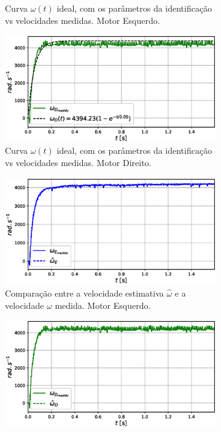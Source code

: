 \begin{figure}[H]
\begin{subfigure}{.5\textwidth}
    \caption{Curva $\omega(t)$ ideal, com os parâmetros da identificação vs velocidades medidas. Motor Esquerdo.}
    \label{fig:exp03:regressao_medido_esquerdo}
    \end{subfigure}
    \hfill
    \begin{subfigure}{.5\textwidth}
    \centering
    \includegraphics[width=\textwidth]{figuras/resultados/exp03/regressao_vs_medido_direito100.eps}
    \caption{Curva $\omega(t)$ ideal, com os parâmetros da identificação vs velocidades medidas. Motor Direito.}
    \label{fig:exp03:regressao_medido_direito}
    \end{subfigure}
    \hfill
    \begin{subfigure}{.5\textwidth}
    \centering
    \includegraphics[width=\textwidth]{figuras/resultados/exp03/filtro_vs_sem_filtro_esquerdo100.eps}
    \caption{Comparação entre a velocidade estimativa $\hat{\omega}$ e a velocidade $\omega$ medida. Motor Esquerdo.}
    \label{fig:exp03:filtragem_esquerdo}
    \end{subfigure}
    \hfill
    \begin{subfigure}{.5\textwidth}
    \centering
    \includegraphics[width=\textwidth]{figuras/resultados/exp03/filtro_vs_sem_filtro_direito100.eps}

\end{subfigure}
\end{figure}
